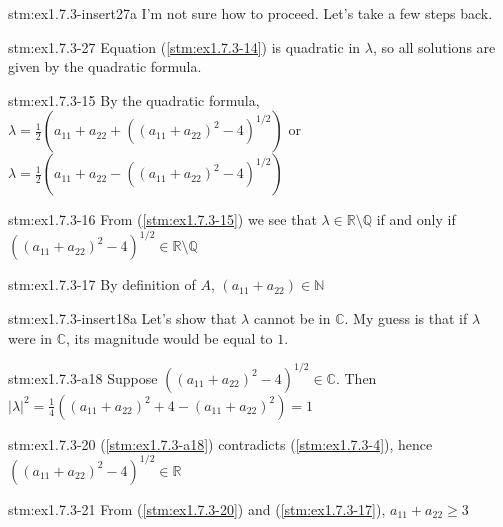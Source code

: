 \begin{explanation}{stm:ex1.7.3-insert27a}
I'm not sure how to proceed. Let's take a few steps back.
\end{explanation}

\begin{explanation}{stm:ex1.7.3-27}
Equation (\ref{stm:ex1.7.3-14}) is quadratic in $\lambda$, so all solutions are given by the quadratic formula.
\end{explanation}

\begin{statement}{stm:ex1.7.3-15}
By the quadratic formula, $\lambda = \frac{1}{2}(a_{11} + a_{22} + ((a_{11} + a_{22})^2 - 4)^{1/2})$ or $\lambda = \frac{1}{2}(a_{11} + a_{22} - ((a_{11} + a_{22})^2 - 4)^{1/2})$
\end{statement}

\begin{statement}{stm:ex1.7.3-16}
From (\ref{stm:ex1.7.3-15}) we see that $\lambda \in \mathbb{R} \setminus \mathbb{Q}$ if and only if $((a_{11} + a_{22})^2 - 4)^{1/2} \in \mathbb{R} \setminus \mathbb{Q}$
\end{statement}

\begin{statement}{stm:ex1.7.3-17}
By definition of $A$, $(a_{11} + a_{22}) \in \mathbb{N}$
\end{statement}

\begin{explanation}{stm:ex1.7.3-insert18a}
Let's show that $\lambda$ cannot be in $\mathbb{C}$. My guess is that if $\lambda$ were in $\mathbb{C}$, its magnitude would be equal to $1$.
\end{explanation}

\begin{statement}{stm:ex1.7.3-a18}
Suppose $((a_{11} + a_{22})^2 - 4)^{1/2} \in \mathbb{C}$. Then $|\lambda|^2 = \frac{1}{4}((a_{11} + a_{22})^2 + 4 - (a_{11} + a_{22})^2) = 1$
\end{statement}

\begin{statement}{stm:ex1.7.3-20}
(\ref{stm:ex1.7.3-a18}) contradicts (\ref{stm:ex1.7.3-4}), hence $((a_{11} + a_{22})^2 - 4)^{1/2} \in \mathbb{R}$
\end{statement}

\begin{statement}{stm:ex1.7.3-21}
From (\ref{stm:ex1.7.3-20}) and (\ref{stm:ex1.7.3-17}), $a_{11} + a_{22} \geq 3$
\end{statement}

